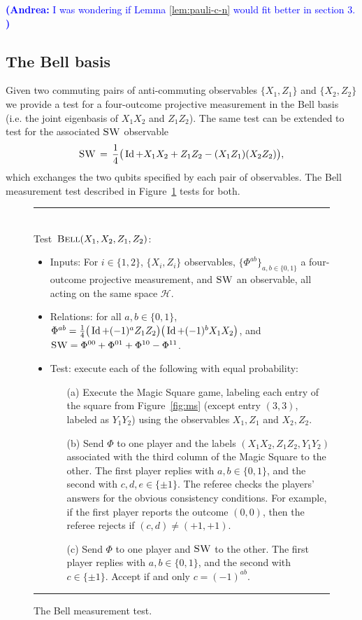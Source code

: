 \documentclass[11pt]{article}
\theoremstyle{remark}
\theoremstyle{definition}
\newcommand{\Id}{\ensuremath{\mathop{\rm Id}\nolimits}}
\newcommand{\mH}{\mathcal{H}}
\newcommand{\bellt}{\textsc{Bell}}
\newcommand{\SWAP}{\textsc{SW}}
\newcommand{\anote}[1]{\textcolor{blue}{\small {\textbf{(Andrea:} #1 \textbf{) }}}}
\begin{document}
\anote{I was wondering if Lemma \ref{lem:pauli-c-n} would fit better in section 3. }


\subsection{The Bell basis}
\label{sec:bell}

Given two commuting pairs of anti-commuting observables $\{X_1,Z_1\}$ and $\{X_2,Z_2\}$ we provide a test for a four-outcome projective measurement in the Bell basis (i.e. the joint eigenbasis of $X_1X_2$ and $Z_1Z_2$). The same test can be extended to test for the associated $\SWAP$ observable
\begin{equation}\label{eq:def-swap}
 \SWAP \,=\, \frac{1}{4} \big( \Id + X_1X_2 + Z_1Z_2 - (X_1Z_1)(X_2Z_2) \big),
\end{equation}
 which exchanges the two qubits specified by each pair of observables. The Bell measurement test described in Figure~\ref{fig:bell} tests for both. 


\begin{figure}[H]
\rule[1ex]{16.5cm}{0.5pt}\\
Test~$\bellt(X_1,X_2,Z_1,Z_2)$:
\begin{itemize}
    \item Inputs: For $i\in\{1,2\}$, $\{X_i,Z_i\}$ observables, $\{\Phi^{ab}\}_{a,b\in\{0,1\}}$ a four-outcome projective measurement, and $\SWAP$ an observable, all acting on the same space $\mH$.
    \item Relations: for all $a,b\in\{0,1\}$, $\Phi^{ab} = \frac{1}{4}\big(\Id+(-1)^a Z_1Z_2\big)\big(\Id+(-1)^bX_1X_2\big)$, and $\SWAP = \Phi^{00} + \Phi^{01} + \Phi^{10} - \Phi^{11}$.   
    \item Test: execute each of the following with equal probability:
		\begin{enumerate}
		\item[(a)] Execute the Magic Square game, labeling each entry of the square from Figure~\ref{fig:ms} (except entry $(3,3)$, labeled as $Y_1Y_2$) using the observables $X_1,Z_1$ and $X_2,Z_2$.
		\item[(b)] Send $\Phi$ to one player and the labels $(X_1X_2,Z_1Z_2,Y_1Y_2)$ associated with the third column of the Magic Square to the other.  The first player replies with $a,b\in\{0,1\}$, and the second with $c,d,e\in \{\pm 1\}$. The referee checks the players' answers for the obvious consistency conditions. For example, if the first player reports the outcome $(0,0)$, then the referee rejects if $(c,d)\neq (+1,+1)$. 
		\item[(c)] Send $\Phi$ to one player and $\SWAP$ to the other. The first player replies with $a,b\in\{0,1\}$, and the second with $c\in \{\pm 1\}$. Accept if and only $c=(-1)^{ab}$. 
		\end{enumerate}
\end{itemize}
\rule[2ex]{16.5cm}{0.5pt}\vspace{-1cm}
\caption{The Bell measurement test.}
\label{fig:bell}
\end{figure}
\end{document}
